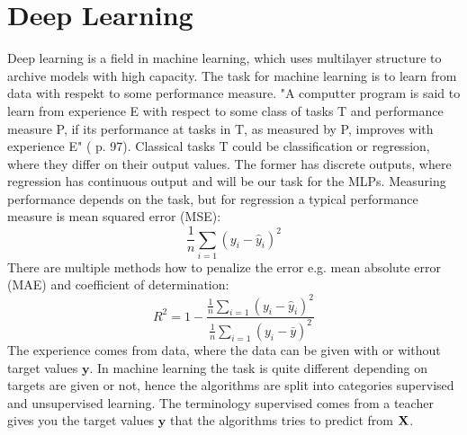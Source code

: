 
\chapter{Deep Learning} %

\label{Chapter4} %

Deep learning is a field in machine learning, which uses multilayer structure to archive models with high capacity. The task for machine learning is to learn from data with respekt to some performance measure. "A computter program is said to learn from experience E with respect to some class of tasks T and performance measure P, if its performance at tasks in T, as measured by P, improves with experience E" (\parencite{Goodfellow-et-al-2016} p. 97). Classical tasks T could be classification or regression, where they differ on their output values. The former has discrete outputs, where regression has continuous output and will be our task for the MLPs. Measuring performance depends on the task, but for regression a typical performance measure is mean squared error (MSE):
$$\frac{1}{n}\sum_{i=1} (y_i-\hat{y}_i)^2$$
There are multiple methods how to penalize the error e.g. mean absolute error (MAE) and coefficient of determination:\\
$$R^2=1-\frac{\frac{1}{n}\sum_{i=1} (y_i-\hat{y}_i)^2}{\frac{1}{n}\sum_{i=1} (y_i-\bar{y})^2}$$
The experience comes from data, where the data can be given with or without target values $\bm{y}$. In machine learning the task is quite different depending on targets are given or not, hence the algorithms are split into categories supervised and unsupervised learning. The terminology supervised comes from a teacher gives you the target values $\bm{y}$ that the algorithms tries to predict from $\mathbf{X}$.\\

